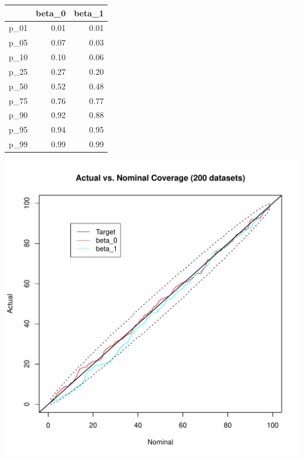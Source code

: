 \documentclass[12pt]{article}
\begin{document}
\begin{table}[ht]
\centering
\begin{tabular}{rrr}
  \hline
 & beta\_0 & beta\_1 \\ 
  \hline
p\_01 & 0.01 & 0.01 \\ 
  p\_05 & 0.07 & 0.03 \\ 
  p\_10 & 0.10 & 0.06 \\ 
  p\_25 & 0.27 & 0.20 \\ 
  p\_50 & 0.52 & 0.48 \\ 
  p\_75 & 0.76 & 0.77 \\ 
  p\_90 & 0.92 & 0.88 \\ 
  p\_95 & 0.94 & 0.95 \\ 
  p\_99 & 0.99 & 0.99 \\ 
   \hline
\end{tabular}
\end{table}
\newline
\includegraphics[width=\textwidth]{coverage_line_plot.pdf}
\end{document}
